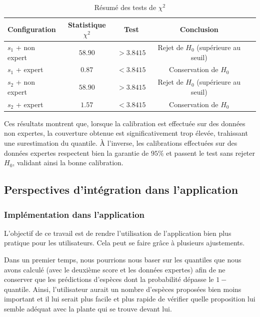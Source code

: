 \documentclass[a4paper,12pt]{article}
\begin{document}
\begin{table}[H]
    \centering
    \begin{tabular}{|l|c|c|c|c|}
        \hline
        \textbf{Configuration} & \textbf{Statistique $\chi^2$} & \textbf{Test} & \textbf{Conclusion} \\
        \hline
        $s_1$ + non expert & $58.90$ & $> 3.8415$ & Rejet de $H_0$ (supérieure au seuil) \\
        $s_1$ + expert & $0.87$ & $< 3.8415$  & Conservation de $H_0$ \\
        $s_2$ + non expert & $58.90$ & $> 3.8415$ & Rejet de $H_0$ (supérieure au seuil) \\
        $s_2$ + expert & $1.57$ & $< 3.8415$ & Conservation de $H_0$ \\
        \hline
    \end{tabular}
    \caption{Résumé des tests de $\chi^2$}
    \label{tab:Tests du Chi-2}
\end{table}

Ces résultats montrent que, lorsque la calibration est effectuée sur des données non expertes, la couverture obtenue est significativement trop élevée, trahissant une surestimation du quantile. À l’inverse, les calibrations effectuées sur des données expertes respectent bien la garantie de $95\%$ et passent le test sans rejeter $H_0$, validant ainsi la bonne calibration.

\subsection{Perspectives d'intégration dans l'application}

\subsubsection{Implémentation dans l'application}

L'objectif de ce travail est de rendre l'utilisation de l'application bien plus pratique pour les utilisateurs. Cela peut se faire grâce à plusieurs ajustements.

\vspace{0.2cm}

Dans un premier temps, nous pourrions nous baser sur les quantiles que nous avons calculé (avec le deuxième score et les données expertes) afin de ne conserver que les prédictions d'espèces dont la probabilité dépasse le $1 -$ quantile. Ainsi, l'utilisateur aurait un nombre d'espèces proposées bien moins important et il lui serait plus facile et plus rapide de vérifier quelle proposition lui semble adéquat avec la plante qui se trouve devant lui.
\end{document}
